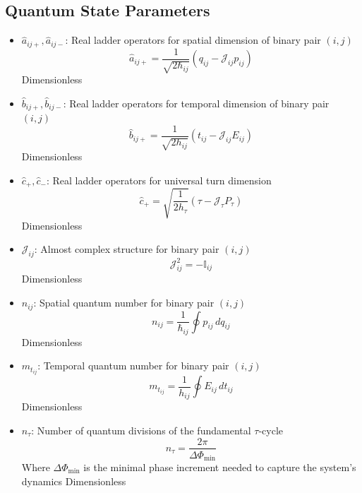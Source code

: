 \documentclass{article}
\begin{document}
\subsection{Quantum State Parameters}

\begin{itemize}
\item $\hat{a}_{ij+}, \hat{a}_{ij-}$: Real ladder operators for spatial dimension of binary pair $(i,j)$
    \begin{equation}
    \hat{a}_{ij+} = \frac{1}{\sqrt{2\hbar_{ij}}}(q_{ij} - \mathcal{J}_{ij} p_{ij})
    \end{equation}
    Dimensionless
    
\item $\hat{b}_{ij+}, \hat{b}_{ij-}$: Real ladder operators for temporal dimension of binary pair $(i,j)$
    \begin{equation}
    \hat{b}_{ij+} = \frac{1}{\sqrt{2h_{ij}}}(t_{ij} - \mathcal{J}_{ij} E_{ij})
    \end{equation}
    Dimensionless
    
\item $\hat{c}_+, \hat{c}_-$: Real ladder operators for universal turn dimension
    \begin{equation}
    \hat{c}_+ = \sqrt{\frac{1}{2h_\tau}}(\tau - \mathcal{J}_\tau P_\tau)
    \end{equation}
    Dimensionless
    
\item $\mathcal{J}_{ij}$: Almost complex structure for binary pair $(i,j)$
    \begin{equation}
    \mathcal{J}_{ij}^2 = -\mathbb{I}_{ij}
    \end{equation}
    Dimensionless
    
\item $n_{ij}$: Spatial quantum number for binary pair $(i,j)$
    \begin{equation}
    n_{ij} = \frac{1}{\hbar_{ij}} \oint p_{ij} \, dq_{ij}
    \end{equation}
    Dimensionless
    
\item $m_{t_{ij}}$: Temporal quantum number for binary pair $(i,j)$
    \begin{equation}
    m_{t_{ij}} = \frac{1}{h_{ij}} \oint E_{ij} \, dt_{ij}
    \end{equation}
    Dimensionless
    
\item $n_\tau$: Number of quantum divisions of the fundamental $\tau$-cycle
    \begin{equation}
    n_\tau = \frac{2\pi}{\Delta\Phi_{\min}}
    \end{equation}
    Where $\Delta\Phi_{\min}$ is the minimal phase increment needed to capture the system's dynamics
    Dimensionless
\end{itemize}
\end{document}
